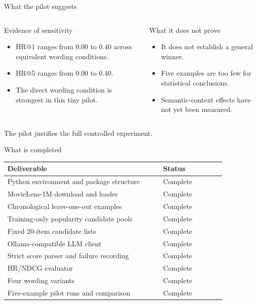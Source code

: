 \documentclass[aspectratio=169,12pt]{beamer}
\begin{document}
\begin{frame}{What the pilot suggests}
\begin{columns}[T]
\begin{exampleblock}{Evidence of sensitivity}
\begin{itemize}
  \item HR@1 ranges from 0.00 to 0.40 across equivalent wording conditions.
  \item HR@5 ranges from 0.00 to 0.40.
  \item The direct wording condition is strongest in this tiny pilot.
\end{itemize}
\end{exampleblock}

\begin{alertblock}{What it does not prove}
\begin{itemize}
  \item It does not establish a general winner.
  \item Five examples are too few for statistical conclusions.
  \item Semantic-context effects have not yet been measured.
\end{itemize}
\end{alertblock}
\end{columns}

\vspace{0.6em}
\centering
\textcolor{DeepBlue}{The pilot justifies the full controlled experiment.}
\end{frame}

\begin{frame}{What is completed}
\begin{tabularx}{\linewidth}{@{}p{0.62\linewidth}p{0.25\linewidth}@{}}
\toprule
\textbf{Deliverable} & \textbf{Status}\\
\midrule
Python environment and package structure & Complete\\
MovieLens-1M download and loader & Complete\\
Chronological leave-one-out examples & Complete\\
Training-only popularity candidate pools & Complete\\
Fixed 20-item candidate lists & Complete\\
Ollama-compatible LLM client & Complete\\
Strict score parser and failure recording & Complete\\
HR/NDCG evaluator & Complete\\
Four wording variants & Complete\\
Five-example pilot runs and comparison & Complete\\
\bottomrule
\end{tabularx}
\end{frame}
\end{document}
